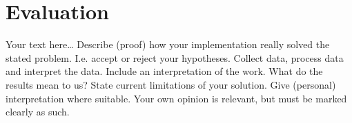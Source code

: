 \chapter{Evaluation}
\label{chap:evaluation}
\chapterstart

Your text here\ldots
Describe (proof) how your implementation really solved the stated problem. I.e. accept or reject your hypotheses. Collect data, process data and interpret the data.
Include an interpretation of the work. What do the results mean to us?
State current limitations of your solution.
Give (personal) interpretation where suitable. Your own opinion is relevant, but must be marked clearly as such.

\chapterend
